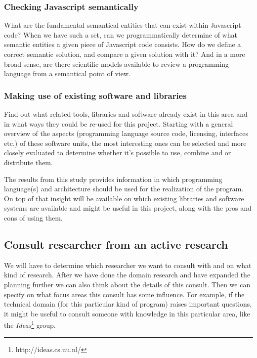 \documentclass{article}
\begin{document}
\subsubsection{Checking Javascript 
semantically} What are the fundamental semantical entities that can exist within 
Javascript code? When we have such a set, can we programmatically determine of 
what semantic entities a given piece of Javascript code consists. How do we 
define a correct semantic solution, and compare a given solution with it? And in 
a more broad sense, are there scientific models available to review a 
programming language from a semantical point of view. \subsubsection{Making use 
of existing software and libraries} Find out what related tools, libraries and 
software already exist in this area and in what ways they could be re-used for 
this project. Starting with a general overview of the aspects (programming 
language source code, licensing, interfaces etc.) of these software units, the 
most interesting ones can be selected and more closely evaluated to determine 
whether it's possible to use, combine and or distribute them. 

The results from this study provides information in which programming 
language(s) and architecture should be used for the realization of the program. 
On top of that insight will be available on which existing libraries and 
software systems are available and might be useful in this project, along with 
the pros and cons of using them. 

\subsection{Consult researcher from an active research} 

We will have to determine which researcher we want to consult with 
and on what kind of research. After we have done the domain research and have 
expanded the planning further we can also think about the details of this 
consult. Then we can specify on what focus areas this consult has some 
influence. For example, if the technical domain (for this particular kind of 
program) raises important questions, it might be useful to consult someone with 
knowledge in this particular area, like the {\em 
Ideas}\footnote{http://ideas.cs.uu.nl/} group. 
\end{document}
